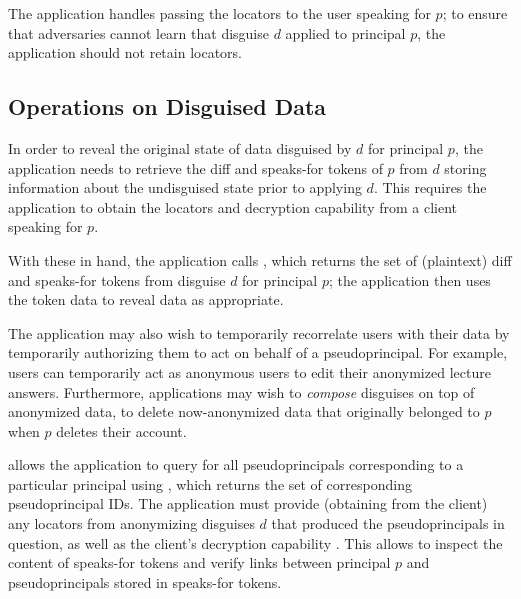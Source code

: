 The application handles passing the locators  to the user speaking for $p$; to ensure that
adversaries cannot learn that disguise $d$ applied to principal $p$, the application should not
retain locators.

\subsection{Operations on Disguised Data}

In order to reveal the original state of data disguised by $d$ for principal $p$, the application
needs to retrieve the diff and speaks-for tokens of $p$ from $d$ storing information about the undisguised
state prior to applying $d$.
This requires the application to obtain the locators  and decryption capability 
from a client speaking for $p$.

With these in hand, the application calls , which returns the set of
(plaintext) diff and speaks-for tokens from disguise $d$ for principal $p$; the application then uses
the token data to reveal data as appropriate.

The application may also wish to temporarily recorrelate users with their data by temporarily
authorizing them to act on behalf of a pseudoprincipal. For example, users can temporarily act as
anonymous users to edit their anonymized lecture answers. Furthermore, applications may wish to
\emph{compose} disguises on top of anonymized data, to \eg delete now-anonymized data that
originally belonged to $p$ when $p$ deletes their account.

\sys allows the application to query for all pseudoprincipals corresponding to a particular
principal using , which returns the set of corresponding pseudoprincipal
IDs. The application must provide (obtaining from the client) any locators  from
anonymizing disguises $d$ that produced the pseudoprincipals in question, as well as the client's
decryption capability . This allows \sys to inspect the content of speaks-for tokens and
verify links between principal $p$ and pseudoprincipals stored in speaks-for tokens.


